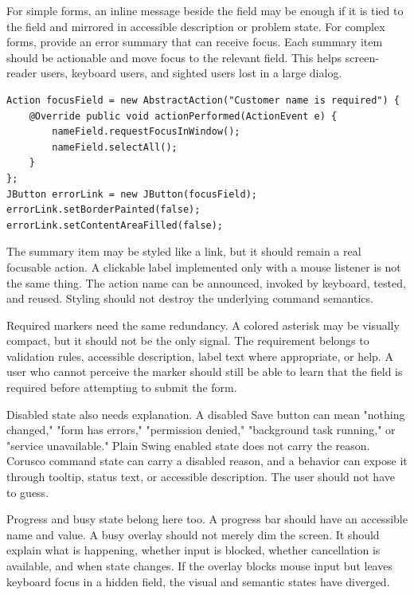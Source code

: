 For simple forms, an inline message beside the field may be enough if it is tied to the field and mirrored in accessible description or problem state. For complex forms, provide an error summary that can receive focus. Each summary item should be actionable and move focus to the relevant field. This helps screen-reader users, keyboard users, and sighted users lost in a large dialog.

\begin{lstlisting}[caption={An error summary item that focuses the field.}]
Action focusField = new AbstractAction("Customer name is required") {
    @Override public void actionPerformed(ActionEvent e) {
        nameField.requestFocusInWindow();
        nameField.selectAll();
    }
};
JButton errorLink = new JButton(focusField);
errorLink.setBorderPainted(false);
errorLink.setContentAreaFilled(false);
\end{lstlisting}

The summary item may be styled like a link, but it should remain a real focusable action. A clickable label implemented only with a mouse listener is not the same thing. The action name can be announced, invoked by keyboard, tested, and reused. Styling should not destroy the underlying command semantics.

Required markers need the same redundancy. A colored asterisk may be visually compact, but it should not be the only signal. The requirement belongs to validation rules, accessible description, label text where appropriate, or help. A user who cannot perceive the marker should still be able to learn that the field is required before attempting to submit the form.

Disabled state also needs explanation. A disabled Save button can mean "nothing changed," "form has errors," "permission denied," "background task running," or "service unavailable." Plain Swing enabled state does not carry the reason. Corusco command state can carry a disabled reason, and a behavior can expose it through tooltip, status text, or accessible description. The user should not have to guess.

Progress and busy state belong here too. A progress bar should have an accessible name and value. A busy overlay should not merely dim the screen. It should explain what is happening, whether input is blocked, whether cancellation is available, and when state changes. If the overlay blocks mouse input but leaves keyboard focus in a hidden field, the visual and semantic states have diverged.

